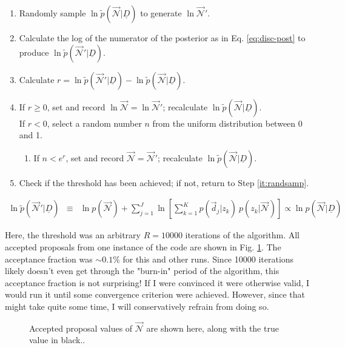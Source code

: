 \documentclass[12pt, onecolumn]{emulateapj}
\newcommand{\textul}{\underline}
\begin{document}
\begin{enumerate}
\item \label{it:randsamp} Randomly sample $\ln\tilde{p}(\vec{\mathcal{N}}|\textul{D})$ to generate $\ln\vec{\mathcal{N}}'$.
\item Calculate the log of the numerator of the posterior as in Eq. \ref{eq:disc-post} to produce $\ln\tilde{p}(\vec{\mathcal{N}}'|\textul{D})$.
\item Calculate $r=\ln\tilde{p}(\vec{\mathcal{N}}'|\textul{D})-\ln\tilde{p}(\vec{\mathcal{N}}|\textul{D})$.
\item If $r\geq0$, set and record $\ln\vec{\mathcal{N}}=\ln\vec{\mathcal{N}}'$; recalculate $\ln\tilde{p}(\vec{\mathcal{N}}|\textul{D})$.\\
If $r<0$, select a random number $n$ from the uniform distribution between 0 and 1.
\begin{enumerate}
\item If $n<e^{r}$, set and record $\vec{\mathcal{N}}=\vec{\mathcal{N}}'$; recalculate $\ln\tilde{p}(\vec{\mathcal{N}}|\textul{D})$.
\end{enumerate}
\item Check if the threshold has been achieved; if not, return to Step \ref{it:randsamp}.
\end{enumerate}

\begin{eqnarray}
\label{eq:disc-post}
\ln\tilde{p}(\vec{\mathcal{N}}'|\textul{D}) &\equiv& \ln p(\vec{\mathcal{N}}) + \sum_{j=1}^{J}\ln\left[\sum_{k=1}^{K}p(\vec{d}_{j}|z_{k})\ p(z_{k}|\vec{\mathcal{N}})\right] \propto \ln p(\vec{\mathcal{N}}|\textul{D})
\end{eqnarray}

Here, the threshold was an arbitrary $R=10000$ iterations of the algorithm.  All accepted proposals from one instance of the code are shown in Fig. \ref{fig:results}.  The acceptance fraction was $\sim0.1\%$ for this and other runs.  Since 10000 iterations likely doesn't even get through the "burn-in" period of the algorithm, this acceptance fraction is not surprising!  If I were convinced it were otherwise valid, I would run it until some convergence criterion were achieved.  However, since that might take quite some time, I will conservatively refrain from doing so.

\begin{figure}
\label{fig:results}
\caption{Accepted proposal values of $\vec{\mathcal{N}}$ are shown here, along with the true value in black..}
\end{figure}
\end{document}
